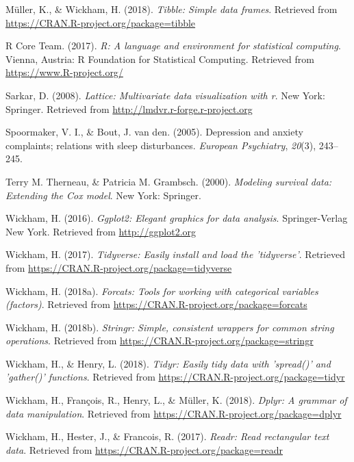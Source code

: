 \documentclass[man, noextraspace]{apa6}
\theoremstyle{definition}
\theoremstyle{definition}
\theoremstyle{definition}
\theoremstyle{remark}
\begin{document}
\hypertarget{ref-R-tibble}{}
Müller, K., \& Wickham, H. (2018). \emph{Tibble: Simple data frames}.
Retrieved from \url{https://CRAN.R-project.org/package=tibble}

\hypertarget{ref-R-base}{}
R Core Team. (2017). \emph{R: A language and environment for statistical
computing}. Vienna, Austria: R Foundation for Statistical Computing.
Retrieved from \url{https://www.R-project.org/}

\hypertarget{ref-R-lattice}{}
Sarkar, D. (2008). \emph{Lattice: Multivariate data visualization with
r}. New York: Springer. Retrieved from
\url{http://lmdvr.r-forge.r-project.org}

\hypertarget{ref-spoormaker2005depression}{}
Spoormaker, V. I., \& Bout, J. van den. (2005). Depression and anxiety
complaints; relations with sleep disturbances. \emph{European
Psychiatry}, \emph{20}(3), 243--245.

\hypertarget{ref-R-survival-book}{}
Terry M. Therneau, \& Patricia M. Grambsch. (2000). \emph{Modeling
survival data: Extending the Cox model}. New York: Springer.

\hypertarget{ref-R-ggplot2}{}
Wickham, H. (2016). \emph{Ggplot2: Elegant graphics for data analysis}.
Springer-Verlag New York. Retrieved from \url{http://ggplot2.org}

\hypertarget{ref-R-tidyverse}{}
Wickham, H. (2017). \emph{Tidyverse: Easily install and load the
'tidyverse'}. Retrieved from
\url{https://CRAN.R-project.org/package=tidyverse}

\hypertarget{ref-R-forcats}{}
Wickham, H. (2018a). \emph{Forcats: Tools for working with categorical
variables (factors)}. Retrieved from
\url{https://CRAN.R-project.org/package=forcats}

\hypertarget{ref-R-stringr}{}
Wickham, H. (2018b). \emph{Stringr: Simple, consistent wrappers for
common string operations}. Retrieved from
\url{https://CRAN.R-project.org/package=stringr}

\hypertarget{ref-R-tidyr}{}
Wickham, H., \& Henry, L. (2018). \emph{Tidyr: Easily tidy data with
'spread()' and 'gather()' functions}. Retrieved from
\url{https://CRAN.R-project.org/package=tidyr}

\hypertarget{ref-R-dplyr}{}
Wickham, H., François, R., Henry, L., \& Müller, K. (2018). \emph{Dplyr:
A grammar of data manipulation}. Retrieved from
\url{https://CRAN.R-project.org/package=dplyr}

\hypertarget{ref-R-readr}{}
Wickham, H., Hester, J., \& Francois, R. (2017). \emph{Readr: Read
rectangular text data}. Retrieved from
\url{https://CRAN.R-project.org/package=readr}
\end{document}
